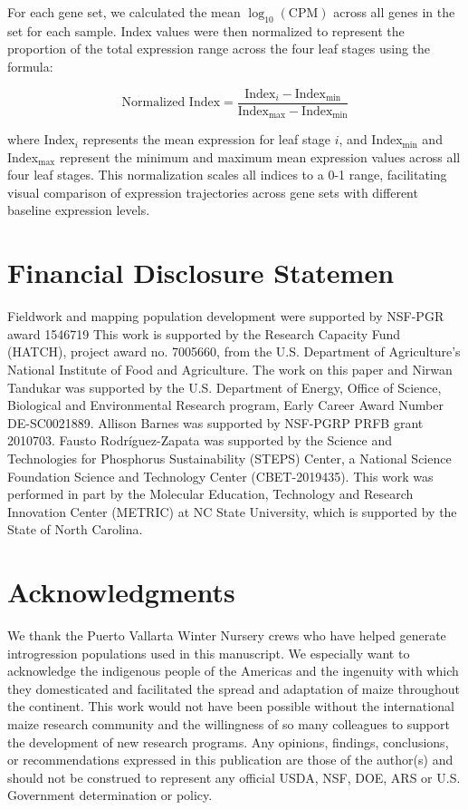 \documentclass[9pt,twocolumn,twoside]{rilabRxiv}
\begin{document}
For each gene set, we calculated the mean $\log_{10}(\text{CPM})$ across all genes in the set for each sample. 
Index values were then normalized to represent the proportion of the total expression range across the four leaf stages using the formula:

$$\text{Normalized Index} = \frac{\text{Index}_i - \text{Index}_{\min}}{\text{Index}_{\max} - \text{Index}_{\min}}$$

where Index$_i$ represents the mean expression for leaf stage $i$, and Index$_{\min}$ and Index$_{\max}$ represent the minimum and maximum mean expression values across all four leaf stages. This normalization scales all indices to a 0-1 range, facilitating visual comparison of expression trajectories across gene sets with different baseline expression levels.


\section{Financial Disclosure Statemen}
 
Fieldwork and mapping population development were supported by NSF-PGR award 1546719 
This work is supported by the Research Capacity Fund (HATCH), project award no. 7005660, from the U.S. Department of Agriculture’s National Institute of Food and Agriculture.  
The work on this paper and Nirwan Tandukar was supported by the U.S. Department of Energy, Office of Science, Biological and Environmental Research program, Early Career Award Number DE-SC0021889.
Allison Barnes was supported by NSF-PGRP PRFB grant 2010703. 
Fausto Rodríguez-Zapata was supported by the Science and Technologies for Phosphorus Sustainability (STEPS) Center, a National Science Foundation Science and Technology Center (CBET-2019435).
This work was performed in part by the Molecular Education, Technology and Research Innovation Center (METRIC) at NC State University, which is supported by the State of North Carolina. 

\section{Acknowledgments}
We thank the  Puerto Vallarta Winter Nursery crews who have helped generate introgression populations used in this manuscript.
We especially want to acknowledge the indigenous people of the Americas and the ingenuity with which they domesticated and facilitated the spread and adaptation of maize throughout the continent.
This work would not have been possible without the international maize research community and the willingness of so many colleagues to support the development of new research programs.
Any opinions, findings, conclusions, or recommendations expressed in this publication are those of the author(s) and should not be construed to represent any official USDA, NSF, DOE, ARS or U.S. Government determination or policy.
\end{document}
